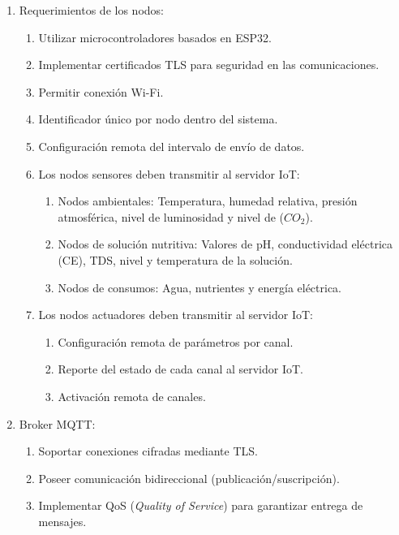 \begin{enumerate}
      \item Requerimientos de los nodos:
            \begin{enumerate}
                  \item Utilizar microcontroladores basados en ESP32.
                  \item Implementar certificados TLS para seguridad en las comunicaciones.
                  \item Permitir conexión Wi-Fi.
                  \item Identificador único por nodo dentro del sistema.
                  \item Configuración remota del intervalo de envío de datos.
                  \item Los nodos sensores deben transmitir al servidor IoT:
                        \begin{enumerate}
                              \item Nodos ambientales: Temperatura, humedad relativa, presión atmosférica, nivel de
                                    luminosidad y nivel de ($CO_2$).
                              \item Nodos de solución nutritiva: Valores de pH, conductividad eléctrica (CE), TDS,
                                    nivel y temperatura de la solución.
                              \item Nodos de consumos: Agua, nutrientes y energía eléctrica.
                        \end{enumerate}
                  \item Los nodos actuadores deben transmitir al servidor IoT:
                        \begin{enumerate}
                              \item Configuración remota de parámetros por canal.
                              \item Reporte del estado de cada canal al servidor IoT.
                              \item Activación remota de canales.
                        \end{enumerate}
            \end{enumerate}

      \item Broker MQTT:
            \begin{enumerate}
                  \item Soportar conexiones cifradas mediante TLS.
                  \item Poseer comunicación bidireccional (publicación/suscripción).
                  \item Implementar QoS (\textit{Quality of Service}) para garantizar entrega de
                        mensajes.
            \end{enumerate}


\end{enumerate}
